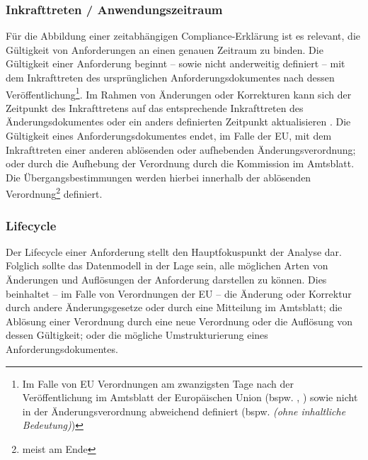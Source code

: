 
\subsubsection{Inkrafttreten / Anwendungszeitraum}

    Für die Abbildung einer zeitabhängigen Compliance-Erklärung ist es relevant, die Gültigkeit von Anforderungen an einen genauen Zeitraum zu binden.
    Die Gültigkeit einer Anforderung beginnt -- sowie nicht anderweitig definiert -- mit dem Inkrafttreten des ursprünglichen Anforderungsdokumentes nach dessen Veröffentlichung\footnote{Im Falle von EU Verordnungen am zwanzigsten Tage nach der Veröffentlichung im Amtsblatt der Europäischen Union (bspw. \cite[Art. 141]{2018R1139}, \cite[Art. 14]{2004R0549}) sowie nicht in der Änderungsverordnung abweichend definiert (bspw.  \textit{(ohne inhaltliche Bedeutung)})}.
    Im Rahmen von Änderungen oder Korrekturen kann sich der Zeitpunkt des Inkrafttretens auf das entsprechende Inkrafttreten des Änderungsdokumentes oder ein anders definierten Zeitpunkt  aktualisieren
    \cite{eu_consolidation}.
    Die Gültigkeit eines Anforderungsdokumentes endet, im Falle der \ac{EU}, mit dem Inkrafttreten einer anderen ablösenden oder aufhebenden Änderungsverordnung; oder durch die Aufhebung der Verordnung durch die Kommission im Amtsblatt. 
    Die Übergangsbestimmungen werden hierbei innerhalb der ablösenden Verordnung\footnote{meist am Ende} definiert.
    
\pagebreak

\subsubsection{Lifecycle}

    Der Lifecycle einer Anforderung stellt den Hauptfokuspunkt der Analyse dar. 
    Folglich sollte das Datenmodell in der Lage sein, alle möglichen Arten von Änderungen und Auflösungen der Anforderung darstellen zu können.
    Dies beinhaltet -- im Falle von Verordnungen der \ac{EU} -- die Änderung oder Korrektur durch andere Änderungsgesetze oder durch eine Mitteilung im Amtsblatt; die Ablösung einer Verordnung durch eine neue Verordnung oder die Auflösung von dessen Gültigkeit; oder die mögliche Umstrukturierung eines Anforderungsdokumentes.
    
